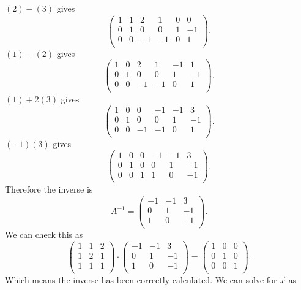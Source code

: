 $(2) - (3)$ gives
\[ 
  \begin{pmatrix}
  1 & 1 & 2 & 1 & 0 & 0\\
  0 & 1 & 0 & 0 & 1 & -1\\
  0 & 0 & -1 & -1 & 0 & 1\\
  \end{pmatrix}
.\]
$(1) - (2)$ gives
\[ 
\begin{pmatrix}
1 & 0 & 2 & 1 & -1 & 1\\
0 & 1 & 0 & 0 & 1 & -1\\
0 & 0 & -1 & -1 & 0 & 1\\
\end{pmatrix}
.\]
$(1) + 2(3)$ gives
\[ 
\begin{pmatrix}
1 & 0 & 0 & -1 & -1 & 3\\
0 & 1 & 0 & 0 & 1 & -1\\
0 & 0 & -1 & -1 & 0 & 1\\
\end{pmatrix}
.\]
$(-1)(3)$ gives
\[ 
\begin{pmatrix}
1 & 0 & 0 & -1 & -1 & 3\\
0 & 1 & 0 & 0 & 1 & -1\\
0 & 0 & 1 & 1 & 0 & -1\\
\end{pmatrix}
.\]
Therefore the inverse is
\[ 
A^{-1} = \begin{pmatrix}
-1 & -1 & 3\\
0 & 1 & -1\\
1 & 0 & -1\\
\end{pmatrix}
.\]
We can check this as
\[ 
\begin{pmatrix}1 & 1 & 2\\1 & 2 & 1\\1 & 1 & 1\\\end{pmatrix} \cdot \begin{pmatrix}-1 & -1 & 3\\0 & 1 & -1\\1 & 0 & -1\\\end{pmatrix} = \left(\begin{array}{ccc} 1 & 0 & 0 \\ 0 & 1 & 0 \\ 0 & 0 & 1 \\\end{array}\right)
.\]
Which means the inverse has been correctly calculated. We can solve for $\Vec{x}$ as
